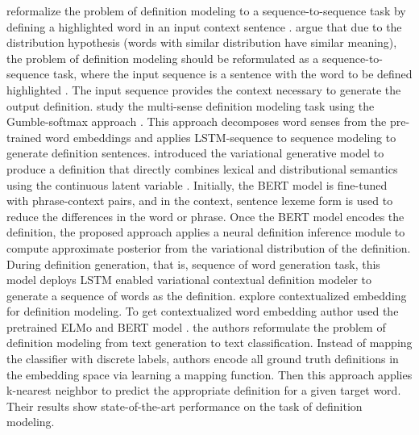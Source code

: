 \citeauthor*{mickus_mark_2019} reformalize the problem of definition modeling to a sequence-to-sequence task by defining a highlighted word in an input context sentence \cite{mickus_mark_2019}. \citeauthor*{mickus_mark_2019} argue that due to the distribution hypothesis (words with similar distribution have similar meaning), the problem of definition modeling should be reformulated as a sequence-to-sequence task, where the input sequence is a sentence with the word to be defined highlighted \cite{mickus_mark_2019}. The input sequence provides the context necessary to generate the output definition. \citeauthor*{zhu_multi_2019} study the multi-sense definition modeling task using the Gumble-softmax approach \cite{zhu_multi_2019}. This approach decomposes word senses from the pre-trained word embeddings and applies LSTM-sequence to sequence modeling to generate definition sentences. \citeauthor*{reid_vcdm_2020} introduced the variational generative model to produce a definition that directly combines lexical and distributional semantics using the continuous latent variable \cite{reid_vcdm_2020}. Initially, the BERT model is fine-tuned with phrase-context pairs, and in the context, sentence lexeme form is used to reduce the differences in the word or phrase. Once the BERT model encodes the definition, the proposed approach applies a neural definition inference module to compute approximate posterior from the variational distribution of the definition. During definition generation, that is, sequence of word generation task, this model deploys LSTM enabled variational contextual definition modeler to generate a sequence of words as the definition. \citeauthor*{chang_what_2019} explore contextualized embedding for definition modeling. To get contextualized word embedding author used the pretrained ELMo and BERT model \cite{chang_what_2019}. the authors reformulate the problem of definition modeling from text generation to text classification. Instead of mapping the classifier with discrete labels, authors encode all ground truth definitions in the embedding space via learning a mapping function. Then this approach applies k-nearest neighbor to predict the appropriate definition for a given target word. Their results show state-of-the-art performance on the task of definition modeling.


